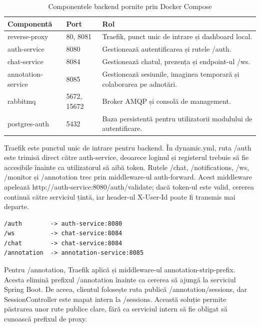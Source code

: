\begin{table}[!htbp]
    \centering
    \small
    \begin{tabular}{p{} p{} p{}}
        \hline
        Componentă & Port & Rol \\
        \hline
        reverse-proxy & 80, 8081 & Traefik, punct unic de intrare și dashboard local. \\
        auth-service & 8080 & Gestionează autentificarea și rutele /auth. \\
        chat-service & 8084 & Gestionează chatul, prezența și endpoint-ul /ws. \\
        annotation-service & 8085 & Gestionează sesiunile, imaginea temporară și colaborarea pe adnotări. \\
        rabbitmq & 5672, 15672 & Broker AMQP și consolă de management. \\
        postgres-auth & 5432 & Baza persistentă pentru utilizatorii modulului de autentificare. \\
        \hline
    \end{tabular}
    \caption{Componentele backend pornite prin Docker Compose}
    \label{tab:componente-backend-docker}
\end{table}

Traefik este punctul unic de intrare pentru backend. În dynamic.yml, ruta /auth este trimisă direct către auth-service, deoarece loginul și registerul trebuie să fie accesibile înainte ca utilizatorul să aibă token. Rutele /chat, /notifications, /ws, /monitor și /annotation trec prin middleware-ul auth-forward. Acest middleware apelează http://auth-service:8080/auth/validate; dacă token-ul este valid, cererea continuă către serviciul țintă, iar header-ul X-User-Id poate fi transmis mai departe.

\begin{verbatim}
/auth        -> auth-service:8080
/ws          -> chat-service:8084
/chat        -> chat-service:8084
/annotation  -> annotation-service:8085
\end{verbatim}

Pentru /annotation, Traefik aplică și middleware-ul annotation-strip-prefix. Acesta elimină prefixul /annotation înainte ca cererea să ajungă la serviciul Spring Boot. De aceea, clientul folosește ruta publică /annotation/sessions, dar SessionController este mapat intern la /sessions. Această soluție permite păstrarea unor rute publice clare, fără ca serviciul intern să fie obligat să cunoască prefixul de proxy.

